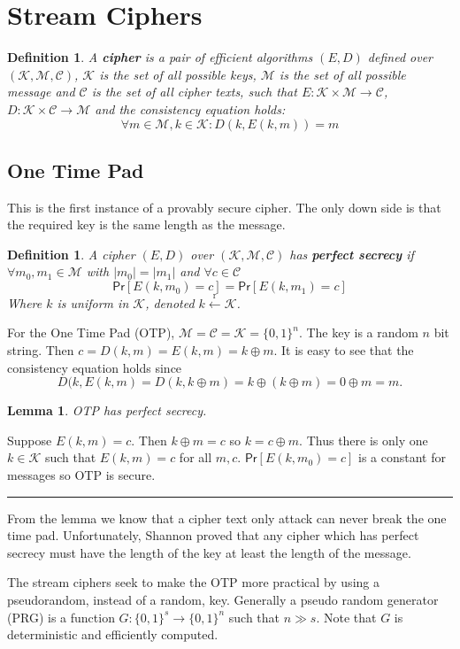 \documentclass[twoside]{article}
\newtheorem{lemma}[theorem]{Lemma}
\newtheorem{definition}[theorem]{Definition}
\newenvironment{proof}{{\bf Proof:}}{\hfill\rule{2mm}{2mm}}
\def\Pr{\mathsf{Pr}}
\def\K{\mathcal{K}}
\def\M{\mathcal{M}}
\def\C{\mathcal{C}}
\begin{document}
\section{Stream Ciphers}
\begin{definition}
A \textbf{cipher} is a pair of efficient algorithms $(E, D)$ defined over $(\K, \M, \C)$, $\K$ is the set of all possible keys, $\M$ is the set of all possible message and $\C$ is the set of all cipher texts, such that $E: \K \times \M \rightarrow \C$, $D: \K \times \C \rightarrow \M$ and the consistency equation holds:
\[\forall m \in \M, k \in \K: D(k, E(k, m)) = m\]
\end{definition}

\subsection{One Time Pad}
This is the first instance of a provably secure cipher. The only down side is that the required key is the same length as the message.

\begin{definition}
A cipher $(E, D)$ over $(\K, \M, \C)$ has \textbf{perfect secrecy} if $\forall m_0, m_1 \in \M$ with $|m_0| = |m_1|$ and $\forall c \in \C$
\[\Pr[E(k, m_0) = c] = \Pr[E(k, m_1) = c]\]
Where $k$ is uniform in $\K$, denoted $k \xleftarrow{\text{r}} \K$.
\end{definition}

For the One Time Pad (OTP), $\M = \C = \K = \{0,1\}^n$. The key is a random $n$ bit string. Then $c = D(k, m) = E(k, m) = k \oplus m$. It is easy to see that the consistency equation holds since 
\[D(k, E(k, m) = D(k, k\oplus m) = k \oplus (k \oplus m) = 0 \oplus m = m.\]

\begin{lemma}
OTP has perfect secrecy.
\end{lemma}
\begin{proof}
Suppose $E(k, m) = c$. Then $k \oplus m = c$ so $k = c \oplus m$. Thus there is only one $k \in \K$ such that $E(k, m) = c$ for all $m, c$. $\Pr[E(k, m_0) = c]$ is a constant for messages so OTP is secure.
\end{proof}

From the lemma we know that a cipher text only attack can never break the one time pad. Unfortunately, Shannon proved that any cipher which has perfect secrecy must have the length of the key at least the length of the message. 

The stream ciphers seek to make the OTP more practical by using a pseudorandom, instead of a random, key. Generally a pseudo random generator (PRG) is a function $G: \{0, 1\}^s \rightarrow \{0,1\}^n$ such that $n \gg s$. Note that $G$ is deterministic and efficiently computed. 
\end{document}
